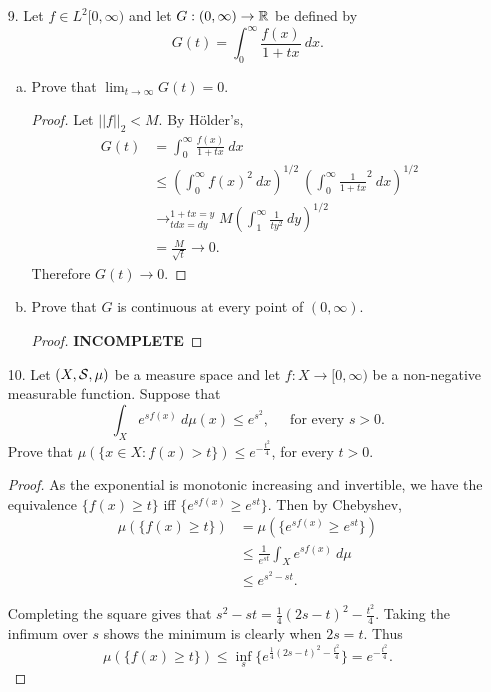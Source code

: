 \begin{itemize}
\item[9.] Let $f \in L^2[0,\infty)$ and let $G : (0,\infty) \rightarrow \mathbb{R}$ be defined by
$$G(t) = \int_0^{\infty} \frac{f(x)}{1+tx} \ dx.$$
\begin{enumerate}[(a)]
\item Prove that $\lim_{t\rightarrow \infty} G(t) = 0$.
\begin{proof}
Let $||f||_2 < M$. By H\"{o}lder's, 
\begin{align*}
    G(t) &= \int_0^{\infty} \frac{f(x)}{1+tx} \ dx \\
    &\leq \left( \int_0^{\infty} f(x)^2 \ dx \right)^{1/2} \ \left( \int_0^{\infty} \frac{1}{1+tx}^2 \ dx \right)^{1/2} \\ 
    &\rightarrow_{tdx=dy}^{1+tx=y} M \left( \int_1^{\infty} \frac{1}{ty^2} \ dy \right)^{1/2} \\ 
    &= \frac{M}{\sqrt{t}} \rightarrow 0.
\end{align*}
Therefore $G(t) \rightarrow 0$.
\end{proof}

\item Prove that $G$ is continuous at every point of $(0,\infty)$.
\begin{proof}
\textbf{INCOMPLETE}
\end{proof}
\end{enumerate}






\item[10.] Let $(X, \mathcal{S}, \mu)$ be a measure space and let $f : X \rightarrow [0,\infty)$ be a
non-negative measurable function. Suppose that
$$\int_{X} e^{sf(x)} \ d\mu(x) \leq e^{s^2}, \ \ \ \ \ \text{ for every } s > 0.$$
Prove that $\mu(\{x \in X : f(x) > t\}) \leq e^{-\frac{t^2}{4}}$, for every $t > 0$.
\begin{proof}
As the exponential is monotonic increasing and invertible, we have the equivalence $\{f(x) \geq t\}$ iff $\{e^{sf(x)} \geq e^{st}\}$. Then by Chebyshev, 
\begin{align*}
    \mu(\{f(x) \geq t\}) &= \mu(\{e^{sf(x)} \geq e^{st}\}) \\
    &\leq \frac{1}{e^{st}} \int_{X} e^{sf(x)} \ d\mu \\
    &\leq e^{s^2-st}.
\end{align*}

Completing the square gives that $s^2-st = \frac{1}{4}(2s-t)^2 - \frac{t^2}{4}$. Taking the infimum over $s$ shows the minimum is clearly when $2s=t$. Thus 
$$\mu(\{f(x) \geq t\}) \leq \inf_s \{e^{\frac{1}{4}(2s-t)^2 - \frac{t^2}{4}}\} = e^{- \frac{t^2}{4}}.$$
\end{proof}














\end{itemize}